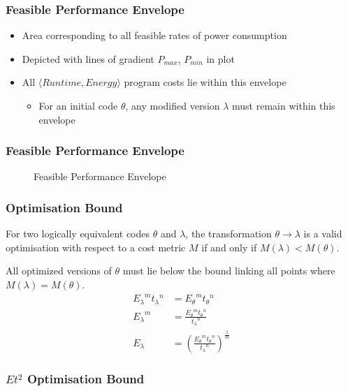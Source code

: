 \documentclass{beamer}
\begin{document}
  \begin{frame}
    \frametitle{Feasible Performance Envelope}
    \begin{itemize}
      \item Area corresponding to all feasible rates of power consumption
      \item Depicted with lines of gradient $P_{max}$, $P_{min}$ in plot
      \item All $\langle Runtime, Energy \rangle$ program costs lie within this envelope
      \begin{itemize}
        \item For an initial code $\theta$, any modified version $\lambda$ must remain within this envelope
      \end{itemize}
    \end{itemize}
  \end{frame}

  \begin{frame}
    \frametitle{Feasible Performance Envelope}
    \begin{figure}
    \centering
    
    \caption{Feasible Performance Envelope}
    \end{figure}
  \end{frame}

  \begin{frame}
    \frametitle{Optimisation Bound}
    \begin{definition}
    For two logically equivalent codes $\theta$ and $\lambda$, the transformation ${\theta \to \lambda}$ is a valid optimisation with respect to a cost metric $M$ if and only if ${M(\lambda) < M(\theta)}$. 
    \end{definition}
All optimized versions of $\theta$ must lie below the bound linking all points where ${M(\lambda) = M(\theta)}$.
\begin{align}
 {E_\lambda}^m{t_\lambda}^n &= {E_\theta}^m{t_\theta}^n \nonumber \\
 {E_\lambda}^m &= \frac{{E_\theta}^m{t_\theta}^n}{{t_\lambda}^n} \nonumber \\
  E_\lambda &= (\frac{{E_\theta}^m{t_\theta}^n}{{t_\lambda}^n})^\frac{1}{m}
\end{align}
  \end{frame}

  \begin{frame}
    \frametitle{$Et^2$ Optimisation Bound}
    \newcommand*{\OPTBOUND}{}%
    \begin{figure}
    \centering
    
    \end{figure}
  \end{frame}
\end{document}
